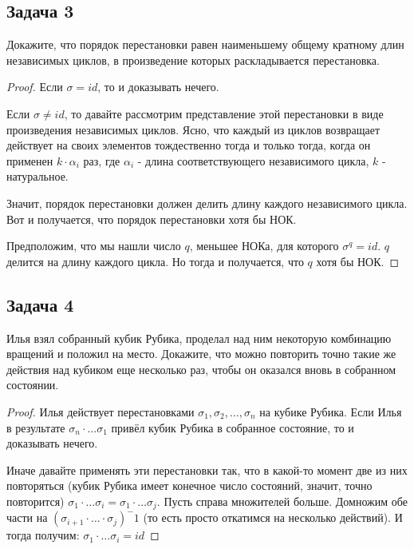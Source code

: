 \subsection{Задача 3}

Докажите, что порядок перестановки равен наименьшему общему кратному длин
независимых циклов, в произведение которых раскладывается перестановка.

\begin{proof}
Если $\sigma = id$, то и доказывать нечего.

Если $\sigma \neq id$, то давайте рассмотрим представление этой перестановки в виде произведения независимых циклов. Ясно, что каждый из циклов возвращает действует на своих элементов тождественно тогда и только тогда, когда он применен $k \cdot \alpha_i$ раз, где $\alpha_i$ - длина соответствующего независимого цикла, $k$ - натуральное.

Значит, порядок перестановки должен делить длину каждого независимого цикла. Вот и получается, что порядок перестановки хотя бы НОК.

Предположим, что мы нашли число $q$, меньшее НОКа, для которого $\sigma^q = id$. $q$ делится на длину каждого цикла. Но тогда и получается, что $q$ хотя бы НОК.
\end{proof}

\subsection{Задача 4}
Илья взял собранный кубик Рубика, проделал над ним некоторую комбинацию вращений и положил на место. Докажите, что можно повторить точно такие же действия
над кубиком еще несколько раз, чтобы он оказался вновь в собранном состоянии.

\begin{proof}

Илья действует перестановками $\sigma_1, \sigma_2, \ldots, \sigma_n$ на кубике Рубика. Если Илья в результате $\sigma_n \cdot \ldots \sigma_1$ привёл кубик Рубика в собранное состояние, то и доказывать нечего.

Иначе давайте применять эти перестановки так, что в какой-то момент две из них повторяться (кубик Рубика имеет конечное число состояний, значит, точно повторится) $\sigma_1 \cdot \ldots \sigma_i = \sigma_1 \cdot \ldots \sigma_j$. Пусть справа множителей больше. Домножим обе части на $(\sigma_{i+1} \cdot \ldots \cdot \sigma_j)^-1$ (то есть просто откатимся на несколько действий). И тогда получим: $\sigma_1 \cdot \ldots \sigma_i = id$

\end{proof}

